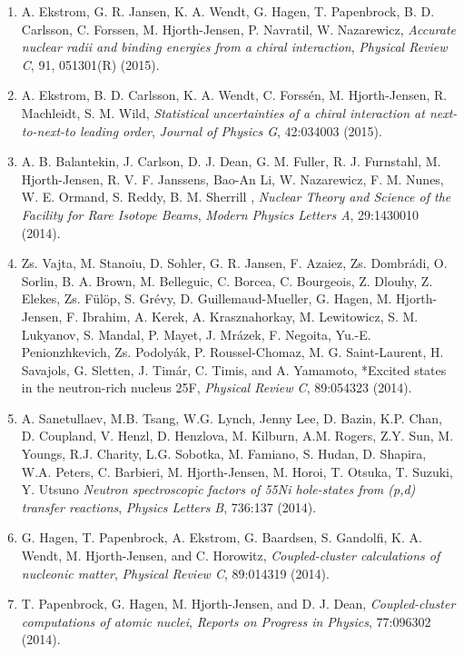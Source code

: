 \documentclass[%
oneside,                 %
final,                   %
10pt]{article}
\begin{document}
\begin{enumerate}
\item A. Ekstrom, G. R. Jansen, K. A. Wendt, G. Hagen, T. Papenbrock, B. D. Carlsson, C. Forssen, M. Hjorth-Jensen, P. Navratil, W. Nazarewicz,   \emph{Accurate nuclear radii and binding energies from a chiral interaction}, \emph{Physical Review C}, 91, 051301(R) (2015).

\item A. Ekstrom, B. D. Carlsson, K. A. Wendt, C. Forssén, M. Hjorth-Jensen, R. Machleidt, S. M. Wild,  \emph{Statistical uncertainties of a chiral interaction at next-to-next-to leading order},   \emph{Journal of Physics G}, 42:034003 (2015).

\item A. B. Balantekin, J. Carlson, D. J. Dean, G. M. Fuller, R. J. Furnstahl, M. Hjorth-Jensen, R. V. F. Janssens, Bao-An Li, W. Nazarewicz, F. M. Nunes, W. E. Ormand, S. Reddy, B. M. Sherrill ,  \emph{Nuclear Theory and Science of the Facility for Rare Isotope Beams},   \emph{Modern Physics Letters A}, 29:1430010 (2014).

\item Zs. Vajta, M. Stanoiu, D. Sohler, G. R. Jansen, F. Azaiez, Zs. Dombrádi, O. Sorlin, B. A. Brown, M. Belleguic, C. Borcea, C. Bourgeois, Z. Dlouhy, Z. Elekes, Zs. Fülöp, S. Grévy, D. Guillemaud-Mueller, G. Hagen, M. Hjorth-Jensen, F. Ibrahim, A. Kerek, A. Krasznahorkay, M. Lewitowicz, S. M. Lukyanov, S. Mandal, P. Mayet, J. Mrázek, F. Negoita, Yu.-E. Penionzhkevich, Zs. Podolyák, P. Roussel-Chomaz, M. G. Saint-Laurent, H. Savajols, G. Sletten, J. Timár, C. Timis, and A. Yamamoto,   *Excited states in the neutron-rich nucleus 25F,   \emph{Physical Review C}, 89:054323 (2014).

\item A. Sanetullaev, M.B. Tsang, W.G. Lynch, Jenny Lee, D. Bazin, K.P. Chan, D. Coupland, V. Henzl, D. Henzlova, M. Kilburn, A.M. Rogers, Z.Y. Sun, M. Youngs, R.J. Charity, L.G. Sobotka, M. Famiano, S. Hudan, D. Shapira, W.A. Peters, C. Barbieri, M. Hjorth-Jensen, M. Horoi, T. Otsuka, T. Suzuki, Y. Utsuno  \emph{Neutron spectroscopic factors of 55Ni hole-states from (p,d) transfer reactions},   \emph{Physics Letters B}, 736:137 (2014).

\item G. Hagen, T. Papenbrock,   A. Ekstrom, G. Baardsen, S. Gandolfi, K. A. Wendt, M. Hjorth-Jensen, and C. Horowitz,  \emph{Coupled-cluster calculations of nucleonic matter},   \emph{Physical Review C},  89:014319 (2014).

\item T. Papenbrock, G. Hagen, M. Hjorth-Jensen, and  D. J. Dean,   \emph{Coupled-cluster computations of atomic nuclei},   \emph{Reports on Progress in Physics}, 77:096302 (2014).


\end{enumerate}
\end{document}
